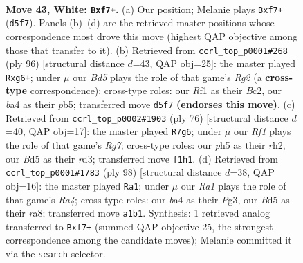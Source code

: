 \documentclass[11pt]{article}
\begin{document}
\clearpage

\begin{figure}[p]\centering
\begin{subfigure}{0.46\textwidth}\centering
\resizebox{\linewidth}{!}{%
\newchessgame
\chessboard[
  setfen={r7/1p3p2/p5k1/3BP2p/bP1r4/P6K/8/R4R2 w - - 1 43},
  showmover=false,
  pgfstyle=straightmove, color=movearrow, markmove={d5-f7}
]}
\caption{}
\end{subfigure}\hfill
\begin{subfigure}{0.46\textwidth}\centering
\resizebox{\linewidth}{!}{%
\newchessgame
\chessboard[
  setfen={r7/1r2p1k1/3p1np1/1p1P4/1P6/P6P/2B3R1/5R1K w - - 2 49},
  showmover=false,
  pgfstyle=straightmove, color=movearrow, markmove={g2-g6}
]}
\caption{}
\end{subfigure}
\\[4pt]
\begin{subfigure}{0.46\textwidth}\centering
\resizebox{\linewidth}{!}{%
\newchessgame
\chessboard[
  setfen={7k/2p3R1/1p6/p1p4p/2P2P2/P2rP1R1/7r/4K3 w - - 6 39},
  showmover=false,
  pgfstyle=straightmove, color=movearrow, markmove={g7-g6}
]}
\caption{}
\end{subfigure}\hfill
\begin{subfigure}{0.46\textwidth}\centering
\resizebox{\linewidth}{!}{%
\newchessgame
\chessboard[
  setfen={r7/P2rp1k1/R4pp1/7p/R7/4K1PP/5P2/8 w - - 28 50},
  showmover=false,
  pgfstyle=straightmove, color=movearrow, markmove={a4-a1}
]}
\caption{}
\end{subfigure}
\caption{\textbf{Move 43, White: \texttt{Bxf7+}.} (a) Our position; Melanie plays \texttt{Bxf7+} (\texttt{d5f7}). Panels (b)--(d) are the retrieved master positions whose correspondence most drove this move (highest QAP objective among those that transfer to it). (b) Retrieved from \texttt{ccrl\_top\_p0001\#268} (ply 96) [structural distance $d$=43, QAP obj=25]: the master played \texttt{Rxg6+}; under $\mu$ our \emph{Bd5} plays the role of that game's \emph{Rg2} (a \textbf{cross-type} correspondence); cross-type roles: our \emph{R}f1 as their \emph{B}c2, our \emph{b}a4 as their \emph{p}b5; transferred move \texttt{d5f7} \textbf{(endorses this move)}. (c) Retrieved from \texttt{ccrl\_top\_p0002\#1903} (ply 76) [structural distance $d$=40, QAP obj=17]: the master played \texttt{R7g6}; under $\mu$ our \emph{Rf1} plays the role of that game's \emph{Rg7}; cross-type roles: our \emph{p}h5 as their \emph{r}h2, our \emph{B}d5 as their \emph{r}d3; transferred move \texttt{f1h1}. (d) Retrieved from \texttt{ccrl\_top\_p0001\#1783} (ply 98) [structural distance $d$=38, QAP obj=16]: the master played \texttt{Ra1}; under $\mu$ our \emph{Ra1} plays the role of that game's \emph{Ra4}; cross-type roles: our \emph{b}a4 as their \emph{P}g3, our \emph{B}d5 as their \emph{r}a8; transferred move \texttt{a1b1}. Synthesis: 1 retrieved analog transferred to \texttt{Bxf7+} (summed QAP objective 25, the strongest correspondence among the candidate moves); Melanie committed it via the \texttt{search} selector.}
\label{fig:thought-m84}
\end{figure}
\end{document}
